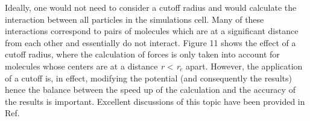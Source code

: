 \documentclass[9pt,bestpractices]{livecoms}
\begin{document}

Ideally, one would not need to consider a cutoff radius and would calculate the
interaction between all particles in the simulations cell. Many of these
interactions correspond to pairs of molecules which are at a significant
distance from each other and essentially do not interact. Figure 11 shows the
effect of a cutoff radius, where the calculation of forces is only taken into
account for molecules whose centers are at a distance \textit{r} {\textless}
\textit{r}$_{c}$ apart. However, the application of a cutoff is, in effect,
modifying the potential (and consequently the results) hence the balance
between the speed up of the calculation and the accuracy of the results is
important. Excellent discussions of this topic have been provided in Ref.
\citep{holcomb1993,trokhymchuk1999,mecke1997,duque2004,blas2008}
\end{document}
